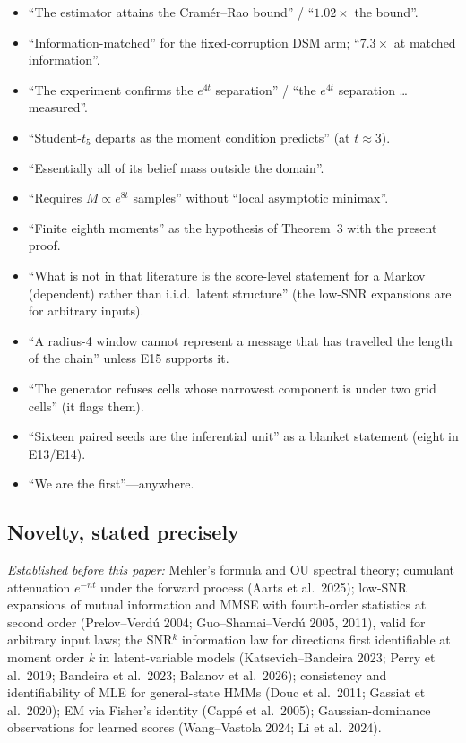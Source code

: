 \begin{itemize}
\item ``The estimator attains the Cram\'er--Rao bound'' / ``$1.02\times$ the bound''.
\item ``Information-matched'' for the fixed-corruption DSM arm; ``$7.3\times$ at matched information''.
\item ``The experiment confirms the $e^{4t}$ separation'' / ``the $e^{4t}$ separation \ldots measured''.
\item ``Student-$t_5$ departs as the moment condition predicts'' (at $t\approx3$).
\item ``Essentially all of its belief mass outside the domain''.
\item ``Requires $M\propto e^{8t}$ samples'' without ``local asymptotic minimax''.
\item ``Finite eighth moments'' as the hypothesis of Theorem~3 with the present proof.
\item ``What is not in that literature is the score-level statement for a Markov (dependent) rather than i.i.d.\ latent structure'' (the low-SNR expansions are for arbitrary inputs).
\item ``A radius-4 window cannot represent a message that has travelled the length of the chain'' unless E15 supports it.
\item ``The generator refuses cells whose narrowest component is under two grid cells'' (it flags them).
\item ``Sixteen paired seeds are the inferential unit'' as a blanket statement (eight in E13/E14).
\item ``We are the first''---anywhere.
\end{itemize}

\subsection{Novelty, stated precisely}

\emph{Established before this paper:} Mehler's formula and OU spectral theory; cumulant attenuation $e^{-nt}$ under the forward process (Aarts et al.\ 2025); low-SNR expansions of mutual information and MMSE with fourth-order statistics at second order (Prelov--Verd\'u 2004; Guo--Shamai--Verd\'u 2005, 2011), valid for arbitrary input laws; the SNR$^k$ information law for directions first identifiable at moment order $k$ in latent-variable models (Katsevich--Bandeira 2023; Perry et al.\ 2019; Bandeira et al.\ 2023; Balanov et al.\ 2026); consistency and identifiability of MLE for general-state HMMs (Douc et al.\ 2011; Gassiat et al.\ 2020); EM via Fisher's identity (Capp\'e et al.\ 2005); Gaussian-dominance observations for learned scores (Wang--Vastola 2024; Li et al.\ 2024).

